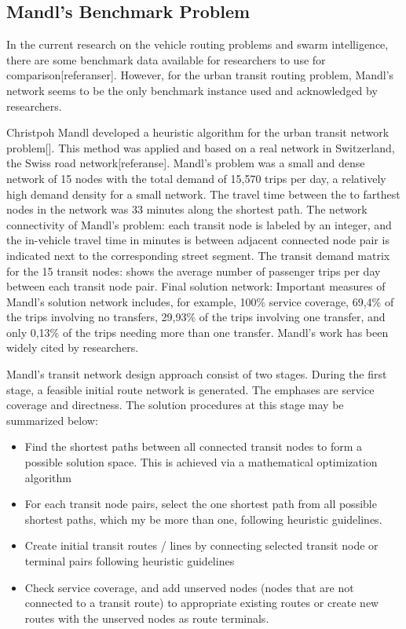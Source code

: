 \subsection{Mandl's Benchmark Problem}

In the current research on the vehicle routing problems and swarm intelligence, there are some benchmark data available for researchers to use for comparison[referanser]. However, for the urban transit routing problem, Mandl's network seems to be the only benchmark instance used and acknowledged by researchers.  
 
Christpoh Mandl developed a heuristic algorithm for the urban transit network problem[]. This method was applied and based on a real network in Switzerland, the Swiss road network[referanse]. Mandl's problem was a small and dense network of 15 nodes with the total demand of 15,570 trips per day, a relatively high demand density for a small network. The travel time between the to farthest nodes in the network was 33 minutes along the shortest path. The network connectivity of Mandl's problem: each transit node is labeled by an integer, and the in-vehicle travel time in minutes is between adjacent connected node pair is indicated next to the corresponding street segment. The transit demand matrix for the 15 transit nodes: shows the average number of passenger trips per day between each transit node pair. Final solution network: Important measures of Mandl's solution network includes, for example, 100\% service coverage, 69,4\% of the trips involving no transfers, 29,93\% of the trips involving one transfer, and only 0,13\% of the trips needing more than one transfer. Mandl's work has been widely cited by researchers. 

Mandl's transit network design approach consist of two stages. During the first stage, a feasible initial route network is generated. The emphases are service coverage and directness. The solution procedures at this stage may be summarized below:
\begin{itemize}
\item Find the shortest paths between all connected transit nodes to form a possible solution space. This is achieved via a mathematical optimization algorithm
\item For each transit node pairs, select the one shortest path from all possible shortest paths, which my be more than one, following heuristic guidelines.
\item Create initial transit routes / lines by connecting selected transit node or terminal pairs following heuristic guidelines
\item Check service coverage, and add unserved nodes (nodes that are not connected to a transit route) to appropriate existing routes or create new routes with the unserved nodes as route terminals.
\end{itemize}

